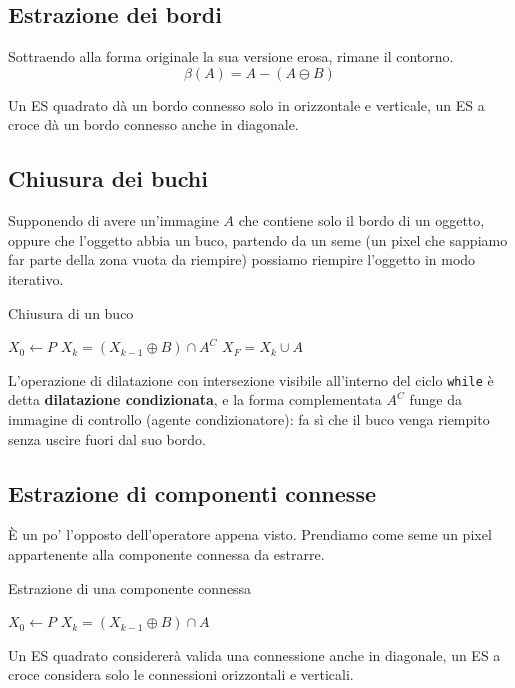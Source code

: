 \documentclass[a4paper,11pt]{article}
\begin{document}
\subsection{Estrazione dei bordi}
Sottraendo alla forma originale la sua versione erosa, rimane il contorno.
\[
\beta(A) = A - (A \ominus B)
\]
\par
Un ES quadrato dà un bordo connesso solo in orizzontale e verticale, un ES a croce dà un bordo connesso anche in diagonale.

\subsection{Chiusura dei buchi}
Supponendo di avere un'immagine $A$ che contiene solo il bordo di un oggetto, oppure che l'oggetto abbia un buco, partendo da un seme (un pixel che sappiamo far parte della zona
vuota da riempire) possiamo riempire l'oggetto in modo iterativo.

\begin{algorithm}
\caption{Chiusura di un buco}\label{alg2:cap}
\begin{algorithmic}
\State $X_0 \gets P$ 
    \State $X_k = (X_{k-1} \oplus B) \cap A^C$
\EndWhile
\State $X_F = X_k \cup A$
\end{algorithmic}
\end{algorithm}

L'operazione di dilatazione con intersezione visibile all'interno del ciclo \texttt{while} è detta \textbf{dilatazione condizionata},
e la forma complementata $A^C$ funge da immagine di controllo (agente condizionatore): fa sì che il buco venga riempito senza uscire fuori dal suo bordo.

\subsection{Estrazione di componenti connesse}
È un po' l'opposto dell'operatore appena visto. Prendiamo come seme un pixel appartenente alla componente connessa da estrarre.

\begin{algorithm}
\caption{Estrazione di una componente connessa}\label{alg3:cap}
\begin{algorithmic}
\State $X_0 \gets P$ 
    \State $X_k = (X_{k-1} \oplus B) \cap A$
\EndWhile
\end{algorithmic}
\end{algorithm}
Un ES quadrato considererà valida una connessione anche in diagonale, un ES a croce considera solo le connessioni orizzontali e verticali.
\end{document}
